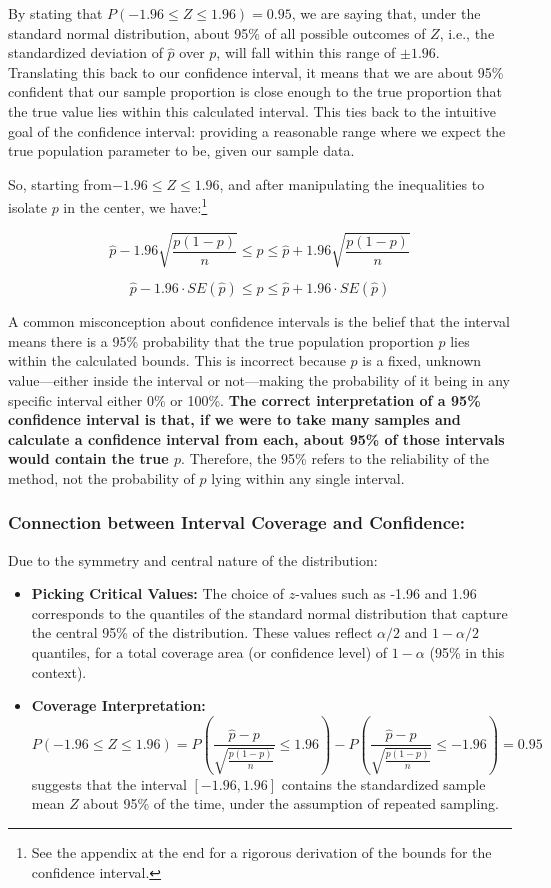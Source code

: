 \documentclass[11pt]{article}
\begin{document}
By stating that \( P(-1.96 \leq Z \leq 1.96) = 0.95 \), we are saying that, under the standard normal distribution, about 95\% of all possible outcomes of $Z$, i.e., the standardized deviation of $\hat{p}$ over $p$,  will fall within this range of  $\pm1.96$. Translating this back to our confidence interval, it means that we are about 95\% confident that our sample proportion is close enough to the true proportion that the true value lies within this calculated interval. This ties back to the intuitive goal of the confidence interval: providing a reasonable range where we expect the true population parameter to be, given our sample data.

So, starting from$ -1.96 \leq Z \leq 1.96$, and after manipulating the inequalities to isolate $p$ in the center, we have:\footnote{See the appendix at the end for a rigorous derivation of the bounds for the confidence interval.}

\[ \hat{p} - 1.96\sqrt{\frac{p(1-p)}{n}} \leq p \leq \hat{p} + 1.96\sqrt{\frac{p(1-p)}{n}}\]

\[ \hat{p} - 1.96 \cdot SE(\hat{p}) \leq p \leq \hat{p} + 1.96 \cdot SE(\hat{p}) \]

A common misconception about confidence intervals is the belief that the interval means there is a 95\% probability that the true population proportion \( p \) lies within the calculated bounds. This is incorrect because \( p \) is a fixed, unknown value—either inside the interval or not—making the probability of it being in any specific interval either 0\% or 100\%. \textbf{The correct interpretation of a 95\% confidence interval is that, if we were to take many samples and calculate a confidence interval from each, about 95\% of those intervals would contain the true \( p \)}. Therefore, the 95\% refers to the reliability of the method, not the probability of \( p \) lying within any single interval.

\subsubsection*{Connection between Interval Coverage and Confidence:}

Due to the symmetry and central nature of the distribution:
\begin{itemize}
  \item \textbf{Picking Critical Values:} The choice of \( z \)-values such as -1.96 and 1.96 corresponds to the quantiles of the standard normal distribution that capture the central 95\% of the distribution. These values reflect \( \alpha/2 \) and \( 1-\alpha/2 \) quantiles, for a total coverage area (or confidence level) of \( 1-\alpha \) (95\% in this context).
  \item \textbf{Coverage Interpretation:}
  \[
  P(-1.96 \leq Z \leq 1.96) = P\left(\frac{\hat{p} - p}{\sqrt{\frac{p(1-p)}{n}}} \leq 1.96\right) - P\left(\frac{\hat{p} - p}{\sqrt{\frac{p(1-p)}{n}}} \leq -1.96\right) = 0.95
  \]
  suggests that the interval \([-1.96, 1.96]\) contains the standardized sample mean \(Z\) about 95\% of the time, under the assumption of repeated sampling.
\end{itemize}
\end{document}
